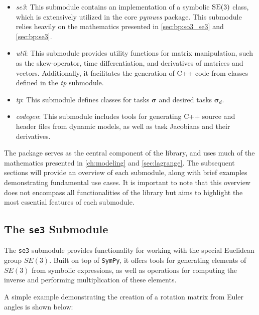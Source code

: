 \begin{itemize}
    \item \emph{se3}: This submodule contains an implementation of a symbolic $\operatorname{SE}(3)$ 
        class, which is extensively utilized in the core \emph{pymuvs} package.
        This submodule relies heavily on the mathematics presented in
        \autoref{sec:bp:so3_se3} and \autoref{sec:bp:se3}.

    
    \item \emph{util}: This submodule provides utility functions for matrix 
        manipulation, such as the skew-operator, time differentiation, and derivatives 
        of matrices and vectors. Additionally, it facilitates the generation of C++ 
        code from classes defined in the \emph{tp} submodule.
    
    \item \emph{tp}: This submodule defines classes for tasks $\bm{\sigma}$ and 
        desired tasks $\bm{\sigma}_d$.
    
    \item \emph{codegen}: This submodule includes tools for generating C++ source 
        and header files from dynamic models, as well as task Jacobians and their derivatives.
\end{itemize}

The \pymuvs{} package serves as the central component of the library, and uses
much of the mathematics presented in \autoref{ch:modeling} and \autoref{sec:lagrange}.
The  subsequent sections will provide an overview of each submodule, along with 
brief examples demonstrating fundamental use cases. It is important to note 
that this overview does not encompass all functionalities of the library but 
aims to highlight the most essential features of each submodule.



\subsection{The \texttt{se3} Submodule}

The \texttt{se3} submodule provides functionality for working with the special Euclidean group $SE(3)$. Built on top of \texttt{SymPy}, it offers tools for generating elements of $SE(3)$ from symbolic expressions, as well as operations for computing the inverse and performing multiplication of these elements.

A simple example demonstrating the creation of a rotation matrix from Euler angles is shown below:

